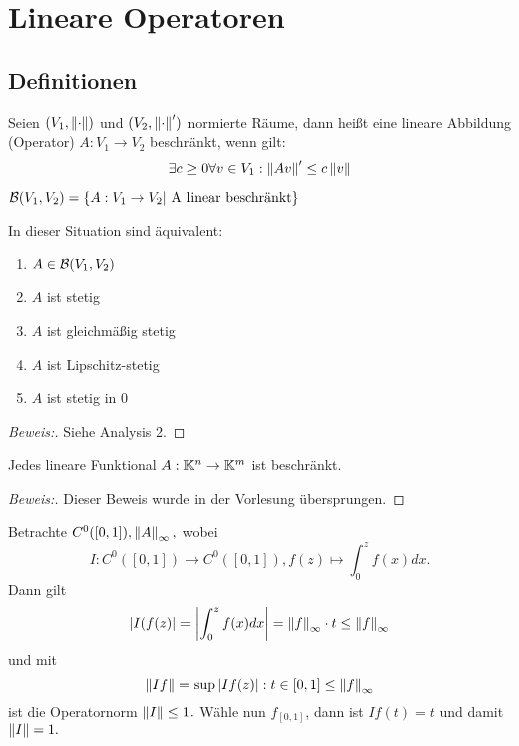 \chapter{Lineare Operatoren}

\section{Definitionen}
\begin{definition}
    Seien $(V_1, \left\lVert\cdot\right\rVert)$ und $(V_2, \left\lVert\cdot\right\rVert')$ normierte Räume, dann heißt eine lineare Abbildung (Operator) $A: V_1 \to V_2$ beschränkt, wenn gilt: \[ \exists c \geq 0 \forall v \in V_1: \left\lVert Av\right\rVert' \leq c \left\lVert v\right\rVert\]
\end{definition}

\begin{rem}
    $\mathcal{B}(V_1, V_2) = \left\{A: V_1 \to V_2| \text{ A linear beschränkt}\right\}$
\end{rem}

\begin{theorem}
    In dieser Situation sind äquivalent:
    \label{B(V,W)_equiv}
    \begin{enumerate}
        \item $A \in \mathcal{B}(V_1, V_2)$
        \item $A$ ist stetig
        \item $A$ ist gleichmäßig stetig
        \item $A$ ist Lipschitz-stetig
        \item $A$ ist stetig in $0$
    \end{enumerate}
    \begin{proof}[Beweis:] Siehe Analysis 2.
    
    \end{proof}
\end{theorem}


\begin{theorem} 
    Jedes lineare Funktional $A: \mathbb{K}^n \to \mathbb{K}^m$ ist beschränkt.
    \begin{proof}[Beweis:] Dieser Beweis wurde in der Vorlesung übersprungen.
    \end{proof}
\end{theorem}

\begin{ex} \label{Volterra_op}
    Betrachte $C^0([0, 1]), \left\lVert A\right\rVert_\infty,$ wobei \[I: C^0([0, 1]) \to C^0([0, 1]), f(z) \mapsto \int_0^zf(x)dx.\] Dann gilt \[\left\lvert I(f(z) \right\rvert = \left\lvert \int_0^zf(x)dx \right\rvert = \left\lVert f\right\rVert_\infty\cdot t \leq \left\lVert f\right\rVert_\infty\]
    und mit \[\left\lVert If\right\rVert = \sup{\left\lvert If(z) \right\rvert:t\in [0, 1]} \leq \left\lVert f\right\rVert_\infty\]
    ist die Operatornorm $\left\lVert I\right\rVert \leq 1.$ Wähle nun $f_{[0, 1]}$, dann ist $If(t) = t$ und damit $\left\lVert I\right\rVert = 1.$
\end{ex}

